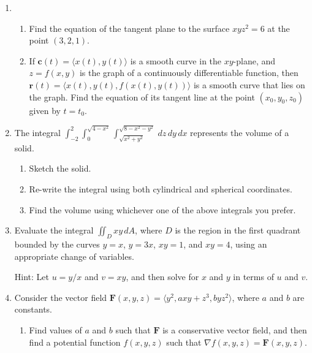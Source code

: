 \documentclass[12pt]{article}
\newcommand{\points}[1]{\marginpar{\hspace{24pt}[#1]}}
\renewcommand{\r}{\mathbf{r}}
\newcommand{\di}{\displaystyle}
\newcommand{\F}{\mathbf{F}}
\begin{document}
\begin{enumerate}
\begin{enumerate}
\end{enumerate}

\newpage

\item
\begin{enumerate}
\item Find the equation of the tangent plane to the surface $xyz^2=6$ at the point $(3,2,1)$. \points{5}

\vspace{3in}

\item If $\mathbf{c}(t) = \langle x(t),y(t)\rangle$ is a smooth curve in the $xy$-plane, and $z=f(x,y)$ is the graph of a continuously differentiable function, then $\r(t) = \langle x(t),y(t),f(x(t),y(t))\rangle$ is a smooth curve that lies on the graph. Find the equation of its tangent line at the point $(x_0,y_0,z_0)$ given by $t=t_0$. \points{7}

\end{enumerate}


\newpage

\item The integral $\di \int_{-2}^2\int_{0}^{\sqrt{4-x^2}}\int_{\sqrt{x^2+y^2}}^{\sqrt{8-x^2-y^2}}\,dz\,dy\,dx$ represents the volume of a solid.
\begin{enumerate}
\item Sketch the solid. \points{2}

\vspace{2in}

\item Re-write the integral using both cylindrical and spherical coordinates. \points{6}

\vspace{3in}

\item Find the volume using whichever one of the above integrals you prefer. \points{4}
\end{enumerate}
\newpage

\item Evaluate the integral $\di \iint_D xy\,dA$, where $D$ is the region in the first quadrant bounded by the curves $y=x$, $y=3x$, $xy=1$, and $xy=4$, using an appropriate change of variables. \points{10}

Hint: Let $u=y/x$ and $v=xy$, and then solve for $x$ and $y$ in terms of $u$ and $v$.

\newpage

\item Consider the vector field $\F(x,y,z) = \langle y^2,axy+z^3,byz^2\rangle$, where $a$ and $b$ are constants.
\begin{enumerate}
\item Find values of $a$ and $b$ such that $\F$ is a conservative vector field, and then find a potential function $f(x,y,z)$ such that $\nabla f(x,y,z) = \F(x,y,z)$. \points{8}


\end{enumerate}
\end{enumerate}
\end{document}
